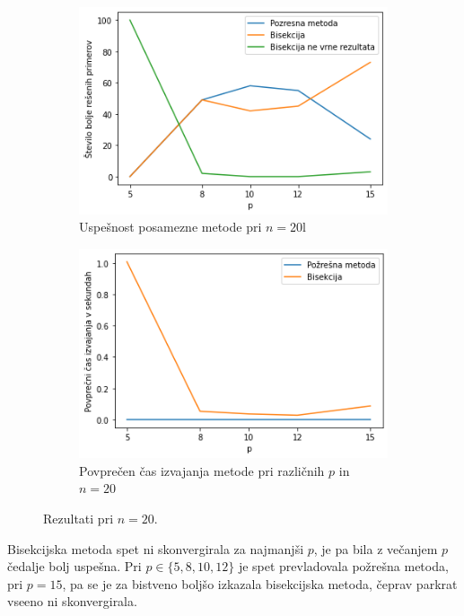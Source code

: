 \documentclass[a4paper]{article}
\begin{document}
\begin{figure}[ht]
	\begin{subfigure}[t]{0.45\textwidth}
		\centering
		\includegraphics[width=\textwidth]{n_20.png}
		\caption{Uspešnost posamezne metode pri $n = 20$l}
		\label{n_20_count}
	\end{subfigure}
	\hfill
	\begin{subfigure}[t]{0.45\textwidth}
		\centering
		\includegraphics[width=\textwidth]{n_20_time.png}
		\caption{Povprečen čas izvajanja metode pri različnih $p$ in $n = 20$}
		\label{n_20_time}
	\end{subfigure}
    \caption{Rezultati pri $n = 20$.}
    \label{fig:n_20}
\end{figure}

Bisekcijska metoda spet ni skonvergirala za najmanjši $p$, je pa bila z večanjem $p$ čedalje bolj uspešna. Pri $p \in \{5, 8, 10, 12\}$ je spet prevladovala požrešna metoda, pri $p = 15$, pa se je za bistveno boljšo izkazala bisekcijska metoda, čeprav parkrat vseeno ni skonvergirala. 
\end{document}
